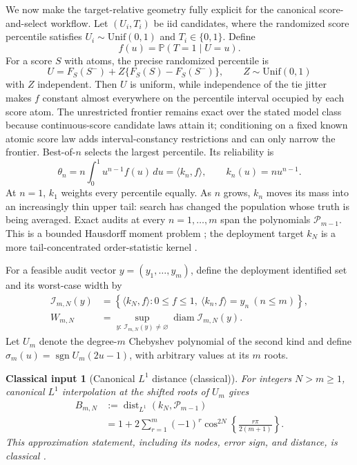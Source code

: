 \documentclass[10pt,twocolumn]{article}
\newtheorem{classicalinput}{Classical input}
\newcommand{\Prb}{\mathbb{P}}
\newcommand{\cP}{\mathcal P}
\newcommand{\dist}{\operatorname{dist}}
\newcommand{\sgn}{\operatorname{sgn}}
\begin{document}
We now make the target-relative geometry fully explicit for the canonical score-and-select workflow. Let $(U_i,T_i)$ be iid candidates, where the randomized score percentile satisfies $U_i\sim\mathrm{Unif}(0,1)$ and $T_i\in\{0,1\}$. Define
\begin{equation}
f(u)=\Prb(T=1\mid U=u).
\label{eq:ranktruth}
\end{equation}
For a score $S$ with atoms, the precise randomized percentile is
\begin{equation}
U=F_S(S^-)+Z\{F_S(S)-F_S(S^-)\},
\qquad Z\sim\mathrm{Unif}(0,1)
\label{eq:randomizedpercentile}
\end{equation}
with $Z$ independent. Then $U$ is uniform, while independence of the tie jitter makes $f$ constant almost everywhere on the percentile interval occupied by each score atom. The unrestricted frontier remains exact over the stated model class because continuous-score candidate laws attain it; conditioning on a fixed known atomic score law adds interval-constancy restrictions and can only narrow the frontier.
Best-of-$n$ selects the largest percentile. Its reliability is
\begin{equation}
\theta_n=n\int_0^1u^{n-1}f(u)\,du
=\langle k_n,f\rangle,\qquad k_n(u)=nu^{n-1}.
\label{eq:spectrum}
\end{equation}
At $n=1$, $k_1$ weights every percentile equally. As $n$ grows, $k_n$ moves its mass into an increasingly thin upper tail: search has changed the population whose truth is being averaged. Exact audits at every $n=1,\ldots,m$ span the polynomials $\cP_{m-1}$. This is a bounded Hausdorff moment problem \citep{hausdorff1921,kadane1971}; the deployment target $k_N$ is a more tail-concentrated order-statistic kernel \citep{david1974,papadatos2017}.

For a feasible audit vector $y=(y_1,\ldots,y_m)$, define the deployment identified set and its worst-case width by
\begin{align}
\mathcal I_{m,N}(y)
&=\left\{\langle k_N,f\rangle:0\le f\le1,
\ \langle k_n,f\rangle=y_n\ (n\le m)\right\},
\label{eq:identifiedsetdefinition}\\
W_{m,N}&=\sup_{y:\,\mathcal I_{m,N}(y)\ne\varnothing}
\operatorname{diam}\mathcal I_{m,N}(y).
\label{eq:worstwidthdefinition}
\end{align}
Let $U_m$ denote the degree-$m$ Chebyshev polynomial of the second kind and define $\sigma_m(u)=\sgn U_m(2u-1)$, with arbitrary values at its $m$ roots.

\begin{classicalinput}[Canonical $L^1$ distance (classical)]
\label{prop:classicaldistance}
For integers $N>m\ge1$, canonical $L^1$ interpolation at the shifted roots of $U_m$ gives
\begin{align}
B_{m,N}
&:=\dist_{L^1}(k_N,\cP_{m-1})\nonumber\\
&=1+2\sum_{r=1}^{m}(-1)^r
\cos^{2N}\!\left\{\frac{r\pi}{2(m+1)}\right\}.
\label{eq:exactfrontier}
\end{align}
This approximation statement, including its nodes, error sign, and distance, is classical \citep{bernstein1926,bojanov1986,watson2000,pinkus1989,mason2003}.
\end{classicalinput}
\end{document}
